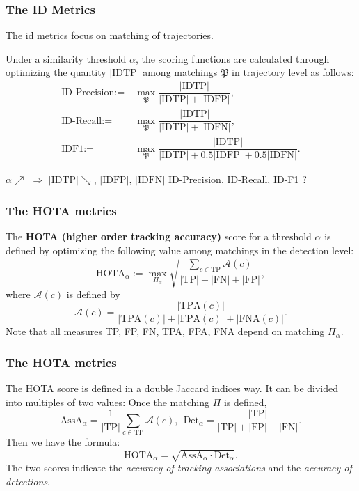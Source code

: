 \documentclass[slidetop, mathserif]{beamer}
\begin{document}
\begin{frame}
	\frametitle{The ID Metrics}
			

	The id metrics focus on matching of trajectories.
			
	\vspace{5pt}
			
	Under a similarity threshold $\alpha$, the scoring functions are calculated
	through optimizing the quantity $|\text{IDTP}|$ among matchings $\mathfrak P$
	in trajectory level as follows:
	\begin{align*}
		\text{ID-Precision} := & ~ \max_{\mathfrak P} \dfrac{|\text{IDTP}|}{|\text{IDTP}| + |\text{IDFP}|}, \\
		\text{ID-Recall} :=    & ~ \max_{\mathfrak P}\dfrac{|\text{IDTP}|}{|\text{IDTP}| + |\text{IDFN}|},  \\
		\text{IDF1} :=         &                                                                            
		~ \max_{\mathfrak P}\dfrac{|\text{IDTP}|}{|\text{IDTP}| + 0.5|\text{IDFP}| + 0.5|\text{IDFN}|}.
	\end{align*}

	$\alpha\nearrow$ $\Rightarrow$ $|\text{IDTP}|\searrow$,
	$|\text{IDFP}|$, $|\text{IDFN}|$ ID-Precision, ID-Recall, ID-F1 $?$

\end{frame}

\begin{frame}
	\frametitle{The HOTA metrics}
		
	The {\bf HOTA (higher order tracking accuracy)} score for a threshold $\alpha$ is defined by
	optimizing the following value among matchings in the detection level:
	\[
		\text{HOTA}_\alpha := 
		\max_{\Pi_\alpha} \sqrt{\dfrac{\sum_{c\in\text{TP}} \mathcal A(c) }{|\text{TP}|+|\text{FN}|+|\text{FP}|}},
	\]
	where $\mathcal A(c)$ is defined by
	\[
		\mathcal A(c) = \dfrac{|\text{TPA}(c)|}{|\text{TPA}(c)|+|\text{FPA}(c)|+|\text{FNA}(c)|}.
	\]
	Note that all measures TP, FP, FN, TPA, FPA, FNA depend on matching $\Pi_\alpha$.
		
\end{frame}

\begin{frame}
	\frametitle{The HOTA metrics}
	The HOTA score is defined in a double Jaccard indices way.
	It can be divided into multiples of two values:
	Once the matching $\Pi$ is defined,
	\[
		\text{AssA}_\alpha = \dfrac{1}{|\text{TP}|} \sum_{c\in\text{TP}} \mathcal A(c), \ \ 
		\text{Det}_\alpha = \dfrac{|\text{TP}|}{|\text{TP}| + |\text{FP}| + |\text{FN}|}.
	\]
	Then we have the formula:
	\[
		\text{HOTA}_\alpha = \sqrt{\text{AssA}_\alpha \cdot \text{Det}_\alpha}.
	\]
	The two scores indicate the \emph{accuracy of tracking associations}
	and the \emph{accuracy of detections}.
\end{frame}
\end{document}
